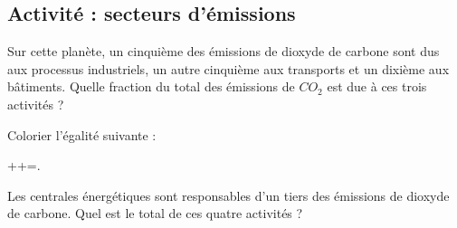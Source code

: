 
\subsection*{Activité : secteurs d'émissions}

Sur cette planète, un cinquième des émissions de dioxyde de carbone sont dus aux processus industriels, un autre cinquième aux transports et un dixième aux bâtiments. Quelle fraction du total des émissions de \( CO_2\) est due à ces trois activités ?

Colorier l'égalité suivante :
\begin{center}
    ++=.
\end{center}

Les centrales énergétiques sont responsables d'un tiers des émissions de dioxyde de carbone. Quel est le total de ces quatre activités ?

